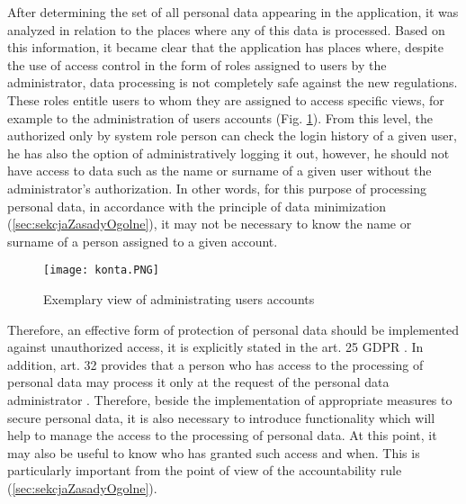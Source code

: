 \documentclass[en, noamssymb]{mgr}
\begin{document}
After determining the set of all personal data appearing in the application, it was analyzed in relation to the places where any of this data is processed. Based on this information, it became clear that the application has places where, despite the use of access control in the form of roles assigned to users by the administrator, data processing is not completely safe against the new regulations. These roles entitle users to whom they are assigned to access specific views, for example to the administration of users accounts (Fig. \ref{fig:accountsAdministration}). From this level, the authorized only by system role person can check the login history of a given user, he has also the option of administratively logging it out, however, he should not have access to data such as the name or surname of a given user without the administrator's authorization. In other words, for this purpose of processing personal data, in accordance with the principle of data minimization (\ref{sec:sekcjaZasadyOgolne}), it may not be necessary to know the name or surname of a person assigned to a given account.

\begin{figure}[]
	\centering
	\texttt{[image: konta.PNG]}
	\caption[Exemplary view of administrating users accounts]{Exemplary view of administrating users accounts}
	\label{fig:accountsAdministration}
\end{figure}

Therefore, an effective form of protection of personal data should be implemented against unauthorized access, it is explicitly stated in the art. 25 GDPR \cite{rodo_art25}. In addition, art. 32 provides that a person who has access to the processing of personal data may process it only at the request of the personal data administrator \cite{rodo_art32}. Therefore, beside the implementation of appropriate measures to secure personal data, it is also necessary to introduce functionality which will help to manage the access to the processing of personal data. At this point, it may also be useful to know who has granted such access and when. This is particularly important from the point of view of the accountability rule (\ref{sec:sekcjaZasadyOgolne}). 


\end{document}
